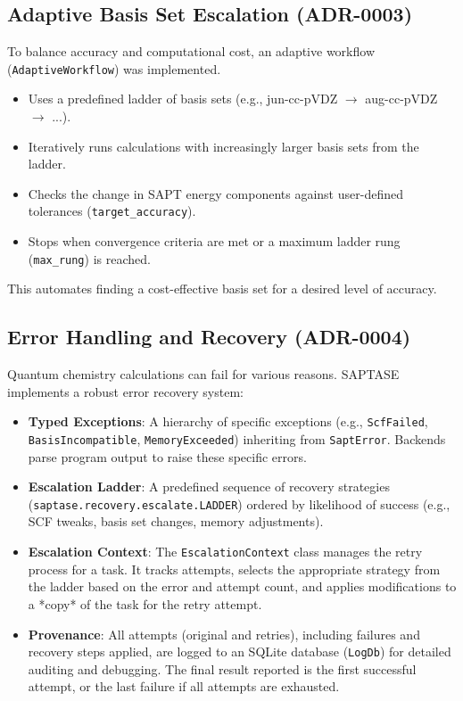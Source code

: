 \documentclass[12pt, a4paper]{report}
\begin{document}
\subsection{Adaptive Basis Set Escalation (ADR-0003)}
To balance accuracy and computational cost, an adaptive workflow (\texttt{AdaptiveWorkflow}) was implemented.
\begin{itemize}
    \item Uses a predefined ladder of basis sets (e.g., jun-cc-pVDZ $\rightarrow$ aug-cc-pVDZ $\rightarrow$ ...).
    \item Iteratively runs calculations with increasingly larger basis sets from the ladder.
    \item Checks the change in SAPT energy components against user-defined tolerances (\texttt{target\_accuracy}).
    \item Stops when convergence criteria are met or a maximum ladder rung (\texttt{max\_rung}) is reached.
\end{itemize}
This automates finding a cost-effective basis set for a desired level of accuracy.

\subsection{Error Handling and Recovery (ADR-0004)}
Quantum chemistry calculations can fail for various reasons. SAPTASE implements a robust error recovery system:
\begin{itemize}
    \item \textbf{Typed Exceptions}: A hierarchy of specific exceptions (e.g., \texttt{ScfFailed}, \texttt{BasisIncompatible}, \texttt{MemoryExceeded}) inheriting from \texttt{SaptError}. Backends parse program output to raise these specific errors.
    \item \textbf{Escalation Ladder}: A predefined sequence of recovery strategies (\texttt{saptase.recovery.escalate.LADDER}) ordered by likelihood of success (e.g., SCF tweaks, basis set changes, memory adjustments).
    \item \textbf{Escalation Context}: The \texttt{EscalationContext} class manages the retry process for a task. It tracks attempts, selects the appropriate strategy from the ladder based on the error and attempt count, and applies modifications to a *copy* of the task for the retry attempt.
    \item \textbf{Provenance}: All attempts (original and retries), including failures and recovery steps applied, are logged to an SQLite database (\texttt{LogDb}) for detailed auditing and debugging. The final result reported is the first successful attempt, or the last failure if all attempts are exhausted.
\end{itemize}
\end{document}
